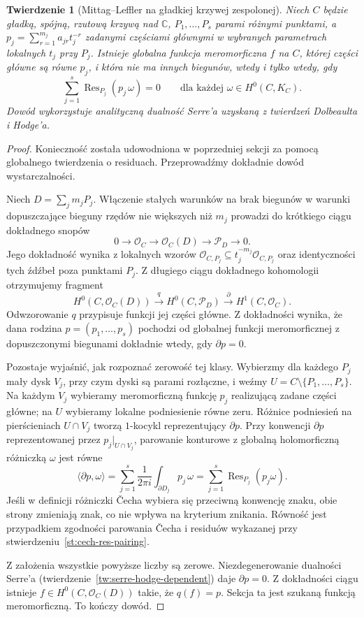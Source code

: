 \documentclass[11pt,a4paper,openany]{report}
\numberwithin{equation}{section}
\theoremstyle{plain}
\newtheorem{twierdzenie}{Twierdzenie}[section]
\theoremstyle{definition}
\theoremstyle{remark}
\newcommand{\C}{\mathbb C}
\begin{document}
\begin{twierdzenie}[Mittag--Leffler na gładkiej krzywej zespolonej]
\label{tw:mittag-curve}
Niech $C$ będzie gładką, spójną, rzutową krzywą
nad $\C$, $P_1,\ldots,P_s$ parami różnymi punktami,
a $p_j=\sum_{r=1}^{m_j}a_{jr}t_j^{-r}$
zadanymi częściami głównymi w wybranych parametrach
lokalnych $t_j$ przy $P_j$. Istnieje globalna
funkcja meromorficzna $f$ na $C$, której części
główne są równe $p_j$, i która nie ma innych
biegunów, wtedy i tylko wtedy, gdy
\[
  \sum_{j=1}^{s}\operatorname{Res}_{P_j}
       (p_j\,\omega)=0
  \qquad\text{dla każdej }\omega\in H^0(C,K_C).
\]
Dowód wykorzystuje analityczną dualność Serre'a
uzyskaną z twierdzeń Dolbeaulta i Hodge'a.
\end{twierdzenie}
\begin{proof}
Konieczność została udowodniona w poprzedniej
sekcji za pomocą globalnego twierdzenia o residuach.
Przeprowadźmy dokładnie dowód wystarczalności.

Niech $D=\sum_jm_jP_j$. Włączenie stałych warunków
na brak biegunów w warunki dopuszczające bieguny
rzędów nie większych niż $m_j$ prowadzi do krótkiego
ciągu dokładnego snopów
\[
 0\longrightarrow\mathcal O_C
 \longrightarrow\mathcal O_C(D)
 \longrightarrow\mathcal P_D\longrightarrow0.
\]
Jego dokładność wynika z lokalnych wzorów
$\mathcal O_{C,P_j}\subseteq
 t_j^{-m_j}\mathcal O_{C,P_j}$ oraz identyczności
tych źdźbeł poza punktami $P_j$.
Z długiego ciągu dokładnego kohomologii otrzymujemy
fragment
\[
 H^0(C,\mathcal O_C(D))\xrightarrow{\ q\ }
 H^0(C,\mathcal P_D)\xrightarrow{\ \partial\ }
 H^1(C,\mathcal O_C).
\]
Odwzorowanie $q$ przypisuje funkcji jej części główne.
Z dokładności wynika, że dana rodzina
$p=(p_1,\ldots,p_s)$ pochodzi od globalnej funkcji
meromorficznej z dopuszczonymi biegunami dokładnie wtedy,
gdy $\partial p=0$.

Pozostaje wyjaśnić, jak rozpoznać zerowość tej klasy.
Wybierzmy dla każdego $P_j$ mały dysk $V_j$, przy czym dyski są parami rozłączne, i weźmy
$U=C\setminus\{P_1,\ldots,P_s\}$. Na każdym
$V_j$ wybieramy meromorficzną funkcję $p_j$ realizującą
zadane części główne; na $U$ wybieramy lokalne podniesienie
równe zeru. Różnice podniesień na pierścieniach
$U\cap V_j$ tworzą $1$-kocykl reprezentujący
$\partial p$. Przy konwencji
$\partial p$ reprezentowanej przez $p_j|_{U\cap V_j}$,
parowanie konturowe z globalną holomorficzną różniczką
$\omega$ jest równe
\[
  \langle\partial p,\omega\rangle
  =\sum_{j=1}^s\frac1{2\pi i}
        \int_{\partial D_j}p_j\,\omega
  =\sum_{j=1}^s\operatorname{Res}_{P_j}(p_j\omega).
\]
Jeśli w definicji różniczki Čecha wybiera się
przeciwną konwencję znaku, obie strony zmieniają
znak, co nie wpływa na kryterium znikania.
Równość jest przypadkiem zgodności parowania
Čecha i residuów wykazanej przy
stwierdzeniu~\ref{st:cech-res-pairing}.

Z założenia wszystkie powyższe liczby są zerowe.
Niezdegenerowanie dualności Serre'a
(twierdzenie~\ref{tw:serre-hodge-dependent}) daje
$\partial p=0$. Z dokładności ciągu istnieje
$f\in H^0(C,\mathcal O_C(D))$ takie, że
$q(f)=p$. Sekcja ta jest szukaną funkcją
meromorficzną. To kończy dowód.
\end{proof}
\end{document}
